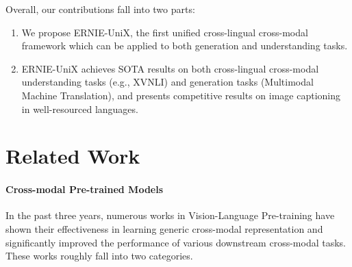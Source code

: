 \documentclass{article}
\begin{document}
Overall, our contributions fall into two parts: 
\begin{enumerate}
\item We propose ERNIE-UniX, the first unified cross-lingual cross-modal framework which can be applied to both generation and understanding tasks.
\item ERNIE-UniX achieves SOTA results on both cross-lingual cross-modal understanding tasks (e.g., XVNLI) and generation tasks (Multimodal Machine Translation), and presents competitive results on image captioning in well-resourced languages. 
\end{enumerate}

\section{Related Work}
\paragraph{Cross-modal Pre-trained Models}
In the past three years, numerous works \cite{vilbert2019,chen2020uniter,simvlm2021,Li2020OscarOA,Kim2021ViLTVT,Jia2021ScalingUV,dou2022an} in Vision-Language Pre-training have shown their effectiveness in learning generic cross-modal representation and significantly improved the performance of various downstream cross-modal tasks. These works roughly fall into two categories. 
\end{document}
